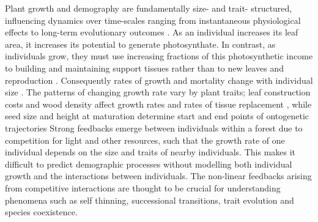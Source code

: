 \documentclass[a4paper,11pt]{article}
\begin{document}
Plant growth and demography are fundamentally size- and trait-
structured, influencing dynamics over time-scales ranging from
instantaneous physiological effects to long-term evolutionary outcomes
\citep{Harper-1977, Westoby-2002}. As an individual increases its leaf
area, it increases its potential to generate photosynthate.  In
contrast, as individuals grow, they must use increasing fractions of
this photosynthetic income to building and maintaining support tissues
rather than to new leaves \citep{Givnish-1988, Enquist-2007} and
reproduction \citep{Thomas-2011}. Consequently rates of growth and
mortality change with individual size \citep{Muller-2006, Ruger-2011, Thomas-2011}.
The patterns of changing growth rate vary by plant traits; leaf
construction costs and wood density affect growth rates and rates of
tissue replacement \citep{Wright-2010}, while seed size and height at
maturation determine start and end points of ontogenetic trajectories
\citep{Westoby-2002}
Strong feedbacks emerge between individuals within a forest due to
competition for light and other resources, such that the growth rate
of one individual depends on the size and traits of nearby
individuals.  This makes it difficult to predict demographic processes
without modelling both individual growth and the interactions between
individuals. The non-linear feedbacks arising from competitive 
interactions are thought to be crucial for understanding phenomena such 
as self thinning, successional transitions, trait evolution and 
species coexistence.
\end{document}
